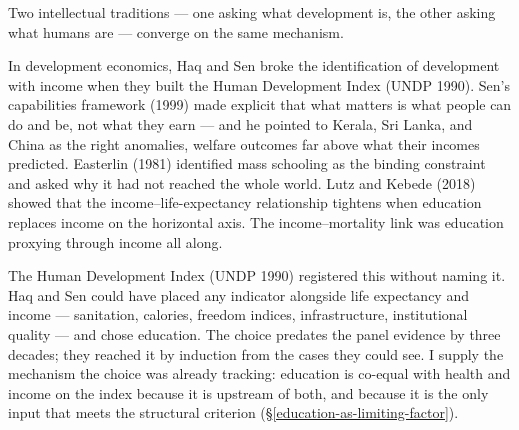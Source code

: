 \documentclass[12pt,letterpaper]{article}
\begin{document}
Two intellectual traditions --- one asking what development is, the
other asking what humans are --- converge on the same mechanism.

In development economics, Haq and Sen broke the identification of
development with income when they built the Human Development Index
(UNDP 1990). Sen's capabilities framework (1999) made explicit that
what matters is what people can do and be, not what they earn --- and
he pointed to Kerala, Sri Lanka, and China as the right anomalies,
welfare outcomes far above what their incomes predicted. Easterlin
(1981) identified mass schooling as the binding constraint and asked
why it had not reached the whole world. Lutz and Kebede (2018) showed
that the income--life-expectancy relationship tightens when education
replaces income on the horizontal axis. The income--mortality link
was education proxying through income all along.

The Human Development Index (UNDP 1990) registered this without
naming it. Haq and Sen could have placed any indicator alongside
life expectancy and income --- sanitation, calories, freedom indices,
infrastructure, institutional quality --- and chose education. The
choice predates the panel evidence by three decades; they reached it
by induction from the cases they could see. I supply the
mechanism the choice was already tracking: education is co-equal
with health and income on the index because it is upstream of both,
and because it is the only input that meets the structural criterion
(\S\ref{education-as-limiting-factor}).
\end{document}
